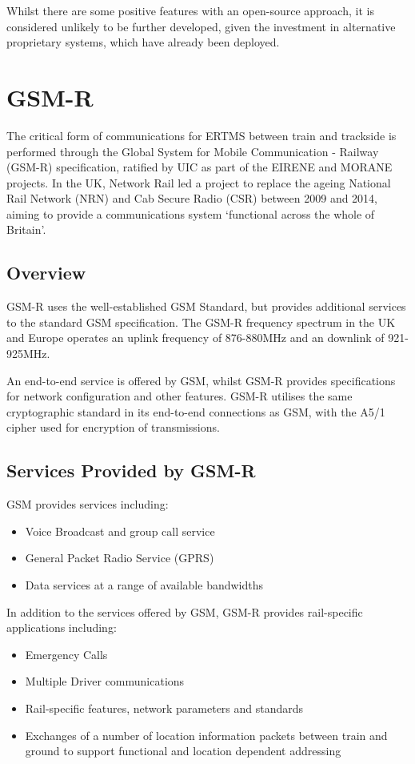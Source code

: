 \documentclass[twoside,11pt,a4paper]{article}
\begin{document}
Whilst there are some positive features with an open-source approach, it is considered unlikely to be further developed, given the investment in alternative proprietary systems, which have already been deployed.
\clearpage

\section{GSM-R}
The critical form of communications for ERTMS between train and trackside is performed through the Global System for Mobile Communication - Railway (GSM-R) specification, ratified by UIC as part of the EIRENE and MORANE projects. In the UK, Network Rail led a project to replace the ageing National Rail Network (NRN) and Cab Secure Radio (CSR) between 2009 and 2014, aiming to provide a communications system `functional across the whole of Britain'\citep{NetworkRail15c}.
\subsection{Overview}
GSM-R uses the well-established GSM Standard, but provides additional services to the standard GSM specification. The GSM-R frequency spectrum in the UK and Europe operates an uplink frequency of 876-880MHz and an downlink of 921-925MHz\citep[p. 36]{EIRENE-SRS}.

An end-to-end service is offered by GSM, whilst GSM-R provides specifications for network configuration and other features. GSM-R utilises the same cryptographic standard in its end-to-end connections as GSM, with the A5/1 cipher used for encryption of transmissions.
\subsection{Services Provided by GSM-R}
GSM provides services including:
\begin{itemize}[nolistsep]
\item Voice Broadcast and group call service
\item General Packet Radio Service (GPRS)
\item Data services at a range of available bandwidths
\end{itemize}
In addition to the services offered by GSM, GSM-R provides rail-specific applications including:
\begin{itemize}[nolistsep]
\item Emergency Calls
\item Multiple Driver communications
\item Rail-specific features, network parameters and standards
\item Exchanges of a number of location information packets between train and ground to support functional and location dependent addressing
\end{itemize}
\end{document}
